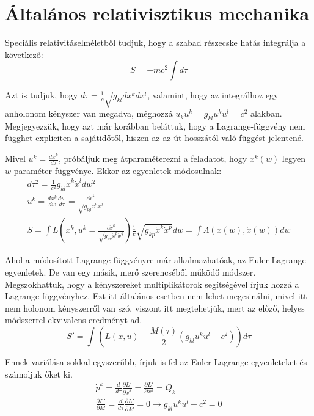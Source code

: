 \documentclass[a4paper,12pt]{article}
\begin{document}
\section{ Általános relativisztikus mechanika}
\par Speciális relativitáselméletből tudjuk, hogy a szabad részecske hatás integrálja a következő:
\begin{equation*}
    S = -mc^{2}\int d\tau
\end{equation*}
\par Azt is tudjuk, hogy $d\tau = \frac{1}{c}\sqrt{g_{kl}dx^{k}dx^{l}}$, valamint, hogy az integrálhoz egy anholonom kényszer van megadva, méghozzá $u_{k}u^{k} = g_{kl}u^{k}u^{l} = c^{2}$ alakban. Megjegyezzük, hogy azt már korábban beláttuk, hogy a Lagrange-függvény nem függhet expliciten a sajátidőtől, hiszen az az út hosszától való függést jelentené.
\par Mivel $u^{k} = \frac{dx^{k}}{d\tau}$, próbáljuk meg átparaméterezni a feladatot, hogy $x^{k}(w)$ legyen $w$ paraméter függvénye. Ekkor az egyenletek módosulnak:
\begin{gather*}
    d\tau^{2} = \frac{1}{c^{2}}g_{kl}\dot{x}^{k}\dot{x}^{l}dw^{2} \\
    u^{k} = \frac{dx^{k}}{dw}\frac{dw}{d\tau} = \frac{c\dot{x}^{k}}{\sqrt{g_{pg}\dot{x}^{p}\dot{x}^{q}}} \\
    S = \int L(x^{k}, u^{k} = \frac{c\dot{x}^{k}}{\sqrt{g_{pg}\dot{x}^{p}\dot{x}^{q}}})\frac{1}{c}\sqrt{g_{kp}\dot{x}^{k}\dot{x}^{p}}dw = \int \Lambda(x(w),\dot{x}(w))dw
\end{gather*}
\par Ahol a módosított Lagrange-függvényre már alkalmazhatóak, az Euler-Lagrange-egyenletek. De van egy másik, merő szerencséből működő módszer. Megszokhattuk, hogy a kényszereket multiplikátorok segítségével írjuk hozzá a Lagrange-függvényhez. Ezt itt általános esetben nem lehet megcsinálni, mivel itt nem holonom kényszerről van szó, viszont itt megtehetjük, mert az előző, helyes módszerrel ekvivalens eredményt ad.
\begin{equation*}
    S' = \int (L(x,u) - \frac{M(\tau)}{2}(g_{kl}u^{k}u^{l} - c^{2}))d\tau
\end{equation*}
\par Ennek variálása sokkal egyszerűbb, írjuk is fel az Euler-Lagrange-egyenleteket és számoljuk őket ki.
\begin{gather*}
    \dot{p}^{k} = \frac{d}{d\tau}\frac{\partial L'}{\partial \dot{x}^{k}} = \frac{\partial L'}{\partial x^{k}} = Q_{k} \\
    \frac{\partial L'}{\partial M} = \frac{d}{d\tau}\frac{\partial L'}{\partial \dot{M}} = 0 \rightarrow g_{kl}u^{k}u^{l} - c^{2} = 0
\end{gather*}
\end{document}
